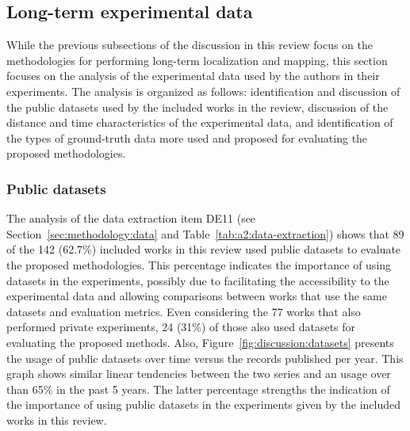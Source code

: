\subsection{Long-term experimental data}
\label{sec:discussion:experiments}

While the previous subsections of the discussion in this review focus on the methodologies for performing long-term localization and mapping, this section focuses on the analysis of the experimental data used by the authors in their experiments. The analysis is organized as follows: identification and discussion of the public datasets used by the included works in the review, discussion of the distance and time characteristics of the experimental data, and identification of the types of ground-truth data more used and proposed for evaluating the proposed methodologies.



\subsubsection{Public datasets}

The analysis of the data extraction item DE11 (see Section~\ref{sec:methodology:data} and Table~\ref{tab:a2:data-extraction}) shows that 89 of the 142 (62.7\%) included works in this review used public datasets to evaluate the proposed methodologies. This percentage indicates the importance of using datasets in the experiments, possibly due to facilitating the accessibility to the experimental data and allowing comparisons between works that use the same datasets and evaluation metrics. Even considering the 77 works that also performed private experiments, 24 (31\%) of those also used datasets for evaluating the proposed methods.
Also, Figure~\ref{fig:discussion:datasets} presents the usage of public datasets over time versus the records published per year.
This graph shows similar linear tendencies between the two series and an usage over than 65\% in the past 5 years. The latter percentage strengths the indication of the importance of using public datasets in the experiments given by the included works in this review.

